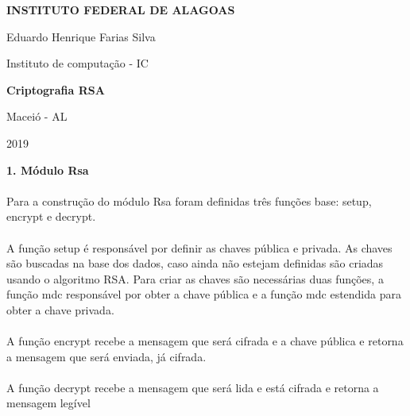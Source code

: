 \documentclass{article}
\begin{document}
\begin{center} \Large \textbf{INSTITUTO FEDERAL DE ALAGOAS} \end{center}
\begin{center}
    \large {Eduardo Henrique Farias Silva}
\end{center}
\begin{center} \large Instituto de computação - IC\end{center}
\vspace{7cm}
\begin{center} \LARGE \textbf{Criptografia RSA} \end{center}
\vspace*{6cm}
\begin{center} \large Maceió - AL\end{center}
\begin{center} \large 2019 \end{center}
\pagebreak

\large \textbf{1. Módulo Rsa} \\ \\
\hspace{1cm} Para a construção do módulo Rsa foram definidas três funções base: setup, encrypt e decrypt.\\ \\
\hspace{1cm} A função setup é responsável por definir as chaves pública e privada. As chaves são buscadas na base dos dados, caso ainda não estejam definidas são criadas usando o algoritmo RSA. Para criar as chaves são necessárias duas funções, a função mdc responsável por obter a chave pública e a função mdc estendida para obter a chave privada.\\ \\
\hspace{1cm} A função encrypt recebe a mensagem que será cifrada e a chave pública e retorna a mensagem que será enviada, já cifrada. \\ \\
\hspace{1cm} A função decrypt recebe a mensagem que será lida e está cifrada e retorna a mensagem legível\\ \\
\end{document}
